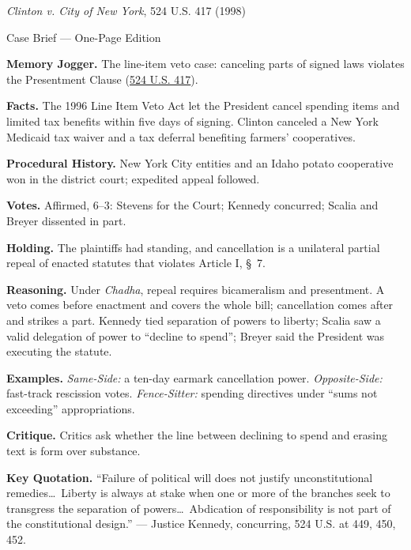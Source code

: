 \documentclass[12pt]{article}
\begin{document}
\begin{center}
{\Large \textit{Clinton v. City of New York}, 524 U.S. 417 (1998)\par}
\vspace{0.3em}
{\normalsize Case Brief --- One-Page Edition\par}
\end{center}

\textbf{Memory Jogger.} The line-item veto case: canceling parts of signed laws violates the Presentment Clause (\href{https://supreme.justia.com/cases/federal/us/524/417/}{524 U.S. 417}).

\textbf{Facts.} The 1996 Line Item Veto Act let the President cancel spending items and limited tax benefits within five days of signing. Clinton canceled a New York Medicaid tax waiver and a tax deferral benefiting farmers' cooperatives.

\textbf{Procedural History.} New York City entities and an Idaho potato cooperative won in the district court; expedited appeal followed.

\textbf{Votes.} Affirmed, 6--3: Stevens for the Court; Kennedy concurred; Scalia and Breyer dissented in part.

\textbf{Holding.} The plaintiffs had standing, and cancellation is a unilateral partial repeal of enacted statutes that violates Article I, \S~7.

\textbf{Reasoning.} Under \textit{Chadha}, repeal requires bicameralism and presentment. A veto comes before enactment and covers the whole bill; cancellation comes after and strikes a part. Kennedy tied separation of powers to liberty; Scalia saw a valid delegation of power to ``decline to spend''; Breyer said the President was executing the statute.

\textbf{Examples.} \emph{Same-Side:} a ten-day earmark cancellation power. \emph{Opposite-Side:} fast-track rescission votes. \emph{Fence-Sitter:} spending directives under ``sums not exceeding'' appropriations.

\textbf{Critique.} Critics ask whether the line between declining to spend and erasing text is form over substance.

\textbf{Key Quotation.} ``Failure of political will does not justify unconstitutional remedies\ldots\ Liberty is always at stake when one or more of the branches seek to transgress the separation of powers\ldots\ Abdication of responsibility is not part of the constitutional design.'' --- Justice Kennedy, concurring, 524 U.S. at 449, 450, 452.
\end{document}
